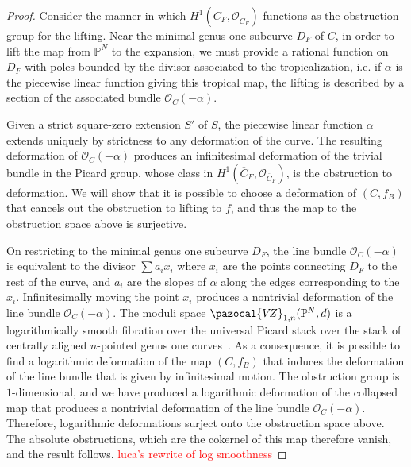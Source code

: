 \documentclass[11pt]{amsart}
\newcommand{\VZ}{\pazocal{V\!Z}}
\renewcommand{\to}{\rightarrow}
\theoremstyle{definition}
\theoremstyle{definition}
\begin{document}
\begin{proof}
Consider the manner in which $H^1(\overline{C}_F,\mathcal O_{\overline{C}_F})$ functions as the obstruction group for the lifting. Near the minimal genus one subcurve $D_F$ of $C$, in order to lift the map from $\mathbb P^N$ to the expansion, we must provide a rational function on $D_F$ with poles bounded by the divisor associated to the tropicalization, i.e. if $\alpha$ is the piecewise linear function giving this tropical map, the lifting is described by a section of the associated bundle $\mathcal O_{C}(-\alpha)$.

Given a strict square-zero extension $S'$ of $S$, the piecewise linear function $\alpha$ extends uniquely by strictness to any deformation of the curve. The resulting deformation of $\mathcal O_{C}(-\alpha)$ produces an infinitesimal deformation of the trivial bundle in the Picard group, whose class in $H^1(\overline{C}_F,\mathcal O_{\overline{C}_F})$, is the obstruction to deformation. We will show that it is possible to choose a deformation of $(C,f_B)$ that cancels out the obstruction to lifting to $f$, and thus the map to the obstruction space above is surjective. 

On restricting to the minimal genus one subcurve $D_F$, the line bundle $\mathcal O_{C}(-\alpha)$ is equivalent to the divisor $\sum a_i x_i$ where $x_i$ are the points connecting $D_F$ to the rest of the curve, and $a_i$ are the slopes of $\alpha$ along the edges corresponding to the $x_i$. Infinitesimally moving the point $x_i$ produces a nontrivial deformation of the line bundle $\mathcal O_{C}(-\alpha)$. The moduli space $\VZ_{1,n}(\mathbb P^N,d)$ is a logarithmically smooth fibration over the universal Picard stack over the stack of centrally aligned $n$-pointed genus one curves~\cite[Remark~4.5.3]{RSPW}. As a consequence, it is possible to find a logarithmic deformation of the map $(C,f_B)$ that induces the deformation of the line bundle that is given by infinitesimal motion. The obstruction group is $1$-dimensional, and we have produced a logarithmic deformation of the collapsed map that produces a nontrivial deformation of the line bundle $\mathcal O_{C}(-\alpha)$. Therefore, logarithmic deformations surject onto the obstruction space above. The absolute obstructions, which are the cokernel of this map therefore vanish, and the result follows.  
\textcolor{red}{luca's rewrite of log smoothness}


\end{proof}
\end{document}
